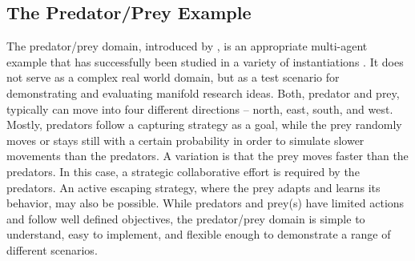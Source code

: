 \subsection{The Predator/Prey Example}
\label{section:the-predator-prey-example}

The predator/prey domain, introduced by \cite{BJD86}, is an appropriate multi-agent example that has successfully been studied in a variety of instantiations \cite{SV00}. It does not serve as a complex real world domain, but as a test scenario for demonstrating and evaluating manifold research ideas. %
Both, predator and prey, typically can move into four different directions -- north, east, south, and west. Mostly, predators follow a capturing strategy as a goal, while the prey randomly moves or stays still with a certain probability in order to simulate slower movements than the predators. A variation is that the prey moves faster than the predators. In this case, a strategic collaborative effort is required by the predators. An active escaping strategy, where the prey adapts and learns its behavior, may also be possible.
While predators and prey(s) have limited actions and follow well defined objectives, the predator/prey domain is simple to understand, easy to implement, and flexible enough to demonstrate a range of different scenarios. %
